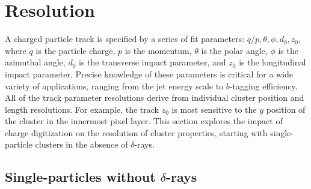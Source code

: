\documentclass[12pt]{article}
\begin{document}
\clearpage

\section{Resolution}
\label{sec:resolution}

A charged particle track is specified by a series of fit parameters: $q/p, \theta,\phi,d_0,z_0$, where $q$ is the particle charge, $p$ is the momentum, $\theta$ is the polar angle, $\phi$ is the azimuthal angle, $d_0$ is the transverse impact parameter, and $z_0$ is the longitudinal impact parameter.  Precise knowledge of these parameters is critical for a wide variety of applications, ranging from the jet energy scale to $b$-tagging efficiency.   All of the track parameter resolutions derive from individual cluster position and length resolutions.  For example, the track $z_0$ is most sensitive to the $y$ position of the cluster in the innermost pixel layer.  This section explores the impact of charge digitization on the resolution of cluster properties, starting with single-particle clusters in the absence of $\delta$-rays.

\subsection{Single-particles without $\delta$-rays}
\end{document}
